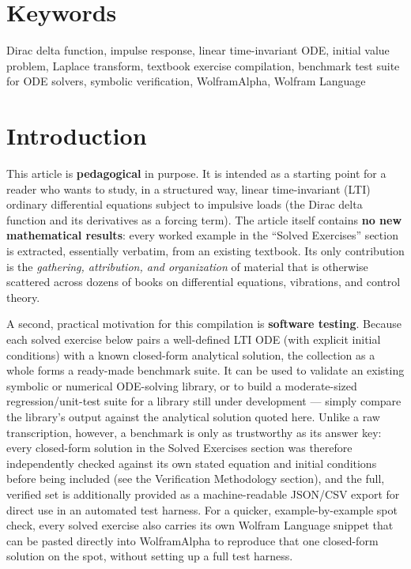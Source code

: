 \documentclass[
  11pt,
]{article}
\begin{document}
\hypertarget{keywords}{%
\section{Keywords}\label{keywords}}

Dirac delta function, impulse response, linear time-invariant ODE,
initial value problem, Laplace transform, textbook exercise compilation,
benchmark test suite for ODE solvers, symbolic verification,
WolframAlpha, Wolfram Language

\hypertarget{introduction}{%
\section{Introduction}\label{introduction}}

This article is \textbf{pedagogical} in purpose. It is intended as a
starting point for a reader who wants to study, in a structured way,
linear time-invariant (LTI) ordinary differential equations subject to
impulsive loads (the Dirac delta function and its derivatives as a
forcing term). The article itself contains \textbf{no new mathematical
results}: every worked example in the ``Solved Exercises'' section is
extracted, essentially verbatim, from an existing textbook. Its only
contribution is the \emph{gathering, attribution, and organization} of
material that is otherwise scattered across dozens of books on
differential equations, vibrations, and control theory.

A second, practical motivation for this compilation is \textbf{software
testing}. Because each solved exercise below pairs a well-defined LTI
ODE (with explicit initial conditions) with a known closed-form
analytical solution, the collection as a whole forms a ready-made
benchmark suite. It can be used to validate an existing symbolic or
numerical ODE-solving library, or to build a moderate-sized
regression/unit-test suite for a library still under development ---
simply compare the library's output against the analytical solution
quoted here. Unlike a raw transcription, however, a benchmark is only as
trustworthy as its answer key: every closed-form solution in the Solved
Exercises section was therefore independently checked against its own
stated equation and initial conditions before being included (see the
Verification Methodology section), and the full, verified set is
additionally provided as a machine-readable JSON/CSV export for direct
use in an automated test harness. For a quicker, example-by-example spot
check, every solved exercise also carries its own Wolfram Language
snippet that can be pasted directly into WolframAlpha to reproduce that
one closed-form solution on the spot, without setting up a full test
harness.
\end{document}
